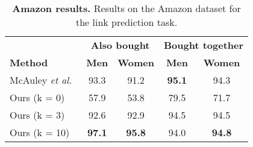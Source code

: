 \documentclass[10pt,twocolumn,letterpaper]{article}
\begin{document}
\begin{table}[t]
\caption{\textbf{Amazon results.} Results on the Amazon dataset for the link prediction task.}
\vskip-0cm
\label{tab:results-amazon}
\begin{center}
\begin{tabular}{l|cccc}
 & \multicolumn{2}{c}{\textbf{Also bought}} & \multicolumn{2}{c}{\textbf{Bought together}}\\
\textbf{Method} & \textbf{Men} & \textbf{Women} & \textbf{Men} & \textbf{Women} \\\shline
McAuley \emph{et al.}~\cite{mcauley2015image} & 93.3 &  91.2 & \textbf{95.1} & 94.3\\
\hline
Ours (k = 0) & 57.9 &  53.8 & 79.5 & 71.7 \\
Ours (k = 3) & 92.6 &  92.9 & 94.5 & 94.5 \\
Ours (k = 10)  & \textbf{97.1} &  \textbf{95.8} & 94.0 & \textbf{94.8} \\
\end{tabular}
\end{center}
\end{table}
\end{document}
